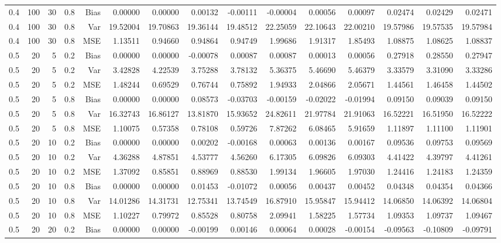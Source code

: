 \begin{table}[!htbp]
\begin{tabular}{lrrrrrrrrrrrrrr}
0.4 & 100 & 30 & 0.8 & Bias & 0.00000 & 0.00000 & 0.00132 & -0.00111 & -0.00004 & 0.00056 & 0.00097 & 0.02474 & 0.02429 & 0.02471 \\
0.4 & 100 & 30 & 0.8 & Var & 19.52004 & 19.70863 & 19.36144 & 19.48512 & 22.25059 & 22.10643 & 22.00210 & 19.57986 & 19.57535 & 19.57984 \\
0.4 & 100 & 30 & 0.8 & MSE & 1.13511 & 0.94660 & 0.94864 & 0.94749 & 1.99686 & 1.91317 & 1.85493 & 1.08875 & 1.08625 & 1.08837 \\
0.5 &  20 &  5 & 0.2 & Bias & 0.00000 & 0.00000 & -0.00078 & 0.00087 & 0.00087 & 0.00013 & 0.00056 & 0.27918 & 0.28550 & 0.27947 \\
0.5 &  20 &  5 & 0.2 & Var & 3.42828 & 4.22539 & 3.75288 & 3.78132 & 5.36375 & 5.46690 & 5.46379 & 3.33579 & 3.31090 & 3.33286 \\
0.5 &  20 &  5 & 0.2 & MSE & 1.48244 & 0.69529 & 0.76744 & 0.75892 & 1.94933 & 2.04866 & 2.05671 & 1.44561 & 1.46458 & 1.44502 \\
0.5 &  20 &  5 & 0.8 & Bias & 0.00000 & 0.00000 & 0.08573 & -0.03703 & -0.00159 & -0.02022 & -0.01994 & 0.09150 & 0.09039 & 0.09150 \\
0.5 &  20 &  5 & 0.8 & Var & 16.32743 & 16.86127 & 13.81870 & 15.93652 & 24.82611 & 21.97784 & 21.91063 & 16.52221 & 16.51950 & 16.52222 \\
0.5 &  20 &  5 & 0.8 & MSE & 1.10075 & 0.57358 & 0.78108 & 0.59726 & 7.87262 & 6.08465 & 5.91659 & 1.11897 & 1.11100 & 1.11901 \\
0.5 &  20 & 10 & 0.2 & Bias & 0.00000 & 0.00000 & 0.00202 & -0.00168 & 0.00063 & 0.00136 & 0.00167 & 0.09536 & 0.09753 & 0.09569 \\
0.5 &  20 & 10 & 0.2 & Var & 4.36288 & 4.87851 & 4.53777 & 4.56260 & 6.17305 & 6.09826 & 6.09303 & 4.41422 & 4.39797 & 4.41261 \\
0.5 &  20 & 10 & 0.2 & MSE & 1.37092 & 0.85851 & 0.88969 & 0.88530 & 1.99134 & 1.96605 & 1.97030 & 1.24416 & 1.24183 & 1.24359 \\
0.5 &  20 & 10 & 0.8 & Bias & 0.00000 & 0.00000 & 0.01453 & -0.01072 & 0.00056 & 0.00437 & 0.00452 & 0.04348 & 0.04354 & 0.04366 \\
0.5 &  20 & 10 & 0.8 & Var & 14.01286 & 14.31731 & 12.75341 & 13.74549 & 16.87910 & 15.95847 & 15.94412 & 14.06850 & 14.06392 & 14.06804 \\
0.5 &  20 & 10 & 0.8 & MSE & 1.10227 & 0.79972 & 0.85528 & 0.80758 & 2.09941 & 1.58225 & 1.57734 & 1.09353 & 1.09737 & 1.09467 \\
0.5 &  20 & 20 & 0.2 & Bias & 0.00000 & 0.00000 & -0.00199 & 0.00146 & 0.00064 & 0.00028 & -0.00154 & -0.09563 & -0.10809 & -0.09791 \\

\end{tabular}
\end{table}
